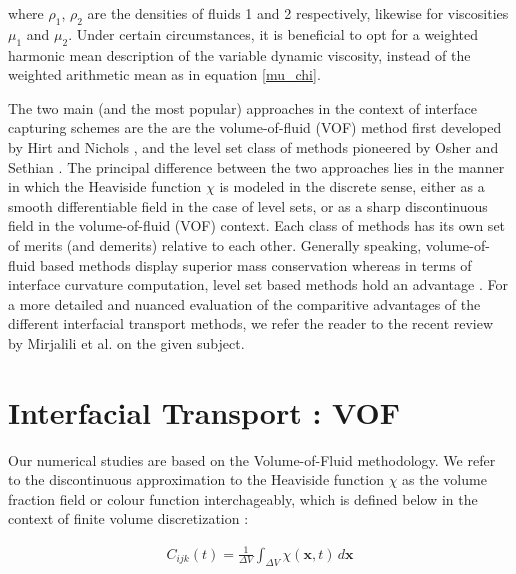 where $\rho_{1}$, $\rho_{2}$ are the densities of fluids 1 and 2 respectively, 
likewise for viscosities $\mu_{1}$ and $\mu_{2}$. Under certain circumstances, 
it is beneficial to opt for a weighted harmonic mean description of the 
variable dynamic viscosity, instead of the weighted arithmetic mean as in equation \ref{mu_chi}. 


The two main (and the most popular)
approaches in the context of interface capturing schemes are the 
are the volume-of-fluid (VOF) method first developed by Hirt and Nichols \cite{hirt1981volume}, 
and the level set class of methods pioneered by Osher and Sethian \cite{osher1988fronts}.
The principal difference between the two approaches lies in the manner in which
the Heaviside function $\chi$ is modeled in the discrete sense, 
either as a smooth differentiable field in
the case of level sets, or as a sharp discontinuous field in the volume-of-fluid (VOF) context.  
Each class of methods has its own set of merits (and demerits) relative to each other. 
Generally speaking, volume-of-fluid based methods display superior mass conservation
whereas in terms of interface curvature computation, level set based methods hold an advantage
 . 
For a more detailed and nuanced evaluation of the comparitive advantages of 
the different interfacial transport methods, we refer the reader to the 
recent review by Mirjalili et al. \cite{mirjalili2017interface} on the given subject.     



\section{Interfacial Transport : VOF}
Our numerical studies are based on the Volume-of-Fluid methodology. 
We refer to the discontinuous approximation to the Heaviside function
$\chi$ as the volume fraction field or colour function interchageably, which 
is defined below in the context of finite volume discretization : 

\begin{align} 
	C_{ijk}\left(t\right) = \frac{1}{\Delta V} \displaystyle\int_{\Delta V} \chi(\boldsymbol{x},t) \,d\boldsymbol x 
\end{align}

